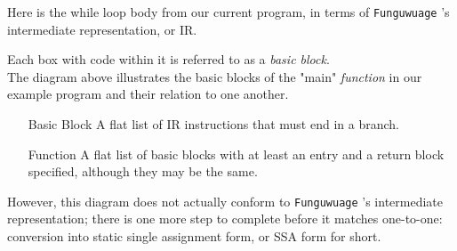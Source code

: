 \documentclass[12pt]{report}
\newcommand{\langname}{Funguwuage}
\newcommand{\lang}{\texttt{\langname} }
\newlength{\inprogramwidth}
\begin{document}
Here is the while loop body from our current program, in terms of \lang's intermediate representation, or IR.
\begin{center}
\end{center}

Each box with code within it is referred to as a \emph{basic block}. \\
The diagram above illustrates the basic blocks of the "main" \emph{function} in our example program and their relation to one another.

\begin{itemize}
\item[Basic Block]
  A flat list of IR instructions that must end in a branch.
\item[Function]
  A flat list of basic blocks with at least an entry and a return block specified, although they may be the same.
\end{itemize}

However, this diagram does not actually conform to \lang's intermediate representation; there is one more step to complete before it matches one-to-one: conversion into static single assignment form, or SSA form for short.
\end{document}
